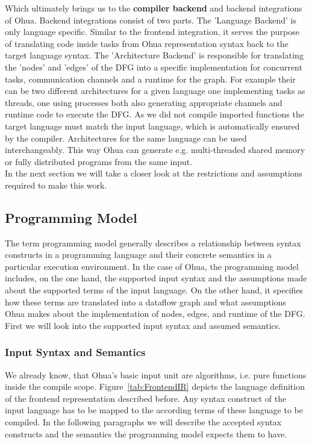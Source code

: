Which ultimately brings us to the \textbf{compiler backend} and backend integrations of Ohua. Backend integrations consist of two parts. The 'Language Backend' is only language specific. Similar to the frontend integration, it serves the purpose of translating code inside tasks from Ohua representation syntax back to the target language syntax. The 'Architecture Backend' is responsible for translating the 'nodes' and 'edges' of the DFG into a specific implementation for concurrent tasks, communication channels and a runtime for the graph. For example their can be two different architectures for a given language one implementing tasks as threads, one using processes both also generating appropriate channels and runtime code to execute the DFG. As we did not compile imported functions the target language must match the input language, which is automatically ensured by the compiler. Architectures for the same language can be used interchangeably. This way Ohua can generate e.g. multi-threaded shared memory or fully distributed programs from the same input.\\

In the next section we will take a closer look at the restrictions and assumptions required to make this work.

\subsection{Programming Model}

The term programming model generally describes a relationship between syntax constructs in a programming language and their concrete semantics in a particular execution environment. In the case of Ohua, the programming model includes, on the one hand, the supported input syntax and the assumptions made about the supported terms of the input language. On the other hand, it specifies how these terms are translated into a dataflow graph and what assumptions Ohua makes about the implementation of nodes, edges, and runtime of the DFG. First we will look into the supported input syntax and assumed semantics. 

\subsubsection{Input Syntax and Semantics}
We already know, that Ohua's basic input unit are algorithms, i.e. pure functions inside the compile scope. Figure~\ref{tab:FrontendIR} depicts the language definition of the frontend representation described before. Any syntax construct of the input language has to be mapped to the according terms of these language to be compiled. In the following paragraphs we will describe the accepted syntax constructs and the semantics the programming model expects them to have. \\


